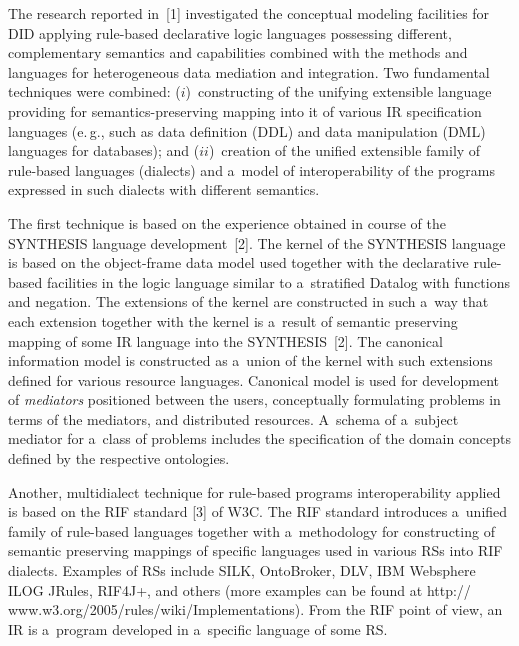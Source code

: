 \begin{multicols}{2}
  The research reported in~[1] investigated the conceptual modeling facilities for
DID applying rule-based declarative logic languages possessing different,
complementary semantics and capabilities combined with the methods and languages
for heterogeneous data mediation and integration. Two fundamental techniques were
combined: ($i$)~constructing of the unifying extensible language providing for
semantics-preserving mapping into it of various IR
specification languages (e.\,g., such as data definition (DDL) and
data manipulation (DML) languages for databases); and ($ii$)~creation of
the unified extensible family of rule-based languages (dialects) and a~model of
interoperability of the programs expressed in such dialects with different semantics.

  The first technique is based on the experience obtained in course of the
SYNTHESIS language development~[2]. The kernel of the SYNTHESIS language is
based on the object-frame data model used together with the declarative rule-based
facilities in the logic language similar to a~stratified Datalog with functions and
negation. The extensions of the kernel are constructed in such a~way that each
extension together with the kernel is a~result of semantic preserving mapping of some
IR language into the SYNTHESIS~[2]. The canonical information model is
constructed as a~union of the kernel with such extensions defined for various resource
languages. Canonical model is used for development of \textit{mediators} positioned
between the users, conceptually formulating problems in terms of the mediators, and
distributed resources. A~schema of a~subject mediator for a~class of problems
includes the specification of the domain concepts defined by the respective
ontologies.
{ %

}

  Another, multidialect technique for rule-based programs interoperability applied is
based on the RIF standard [3] of W3C. The RIF standard introduces a~unified family of rule-based
languages together with a~methodology for constructing of semantic preserving
mappings of specific languages used in various RSs into RIF
dialects. Examples of RSs include {SILK}, {OntoBroker}, {DLV},
{IBM Websphere ILOG JRules}, {RIF4J}\;+, and others
(more examples can be found at {\sf
http:// www.w3.org/2005/rules/wiki/Implementations}). From the RIF point of view, an
IR is a~program developed in a~specific language of some RS.


\end{multicols}
